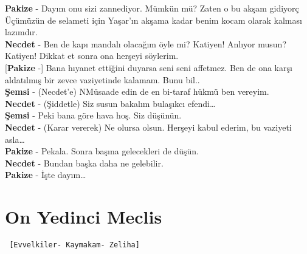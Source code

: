 \documentclass[]{book}
\begin{document}
\textbf{Pakize} - Dayım onu sizi zannediyor. Mümkün mü? Zaten o bu akşam gidiyorç Üçümüzün de selameti için Yaşar'ın akşama kadar benim kocam olarak kalması lazımdır.\\
\textbf{Necdet} - Ben de kapı mandalı olacağım öyle mi? Katiyen! Anlıyor musun? Katiyen! Dikkat et sonra ona herşeyi söylerim.\\
{[}\textbf{Pakize} -{]} Bana hıyanet ettiğini duyarsa seni seni affetmez. Ben de ona karşı aldatılmış bir zevce vaziyetinde kalamam. Bunu bil..\\
\textbf{Şemsi} - (Necdet'e) NMüsaade edin de en bi-taraf hükmü ben vereyim.\\
\textbf{Necdet} - (Şiddetle) Siz susun bakalım bulaşıkcı efendi\ldots{}\\
\textbf{Şemsi} - Peki bana göre hava hoş. Siz düşünün.\\
\textbf{Necdet} - (Karar vererek) Ne olursa olsun. Herşeyi kabul ederim, bu vaziyeti asla\ldots{}\\
\textbf{Pakize} - Pekala. Sonra başına gelecekleri de düşün.\\
\textbf{Necdet} - Bundan başka daha ne gelebilir.\\
\textbf{Pakize} - İşte dayım\ldots{}\\

\hypertarget{on-yedinci-meclis}{%
\section{On Yedinci Meclis}\label{on-yedinci-meclis}}

\begin{verbatim}
 [Evvelkiler- Kaymakam- Zeliha]
\end{verbatim}
\end{document}
